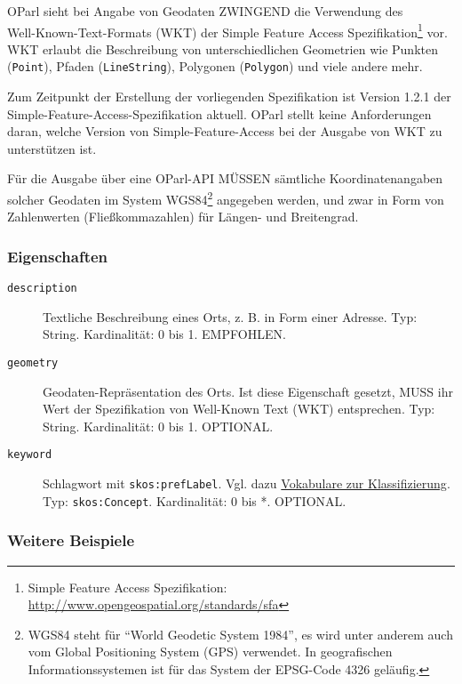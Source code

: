 \documentclass[,a4paper]{article}
\begin{document}
OParl sieht bei Angabe von Geodaten ZWINGEND die Verwendung
des\\Well-Known-Text-Formats (WKT) der Simple Feature Access
Spezifikation\footnote{Simple Feature Access Spezifikation:
  \url{http://www.opengeospatial.org/standards/sfa}} vor. WKT erlaubt
die Beschreibung von unterschiedlichen Geometrien wie Punkten
(\texttt{Point}), Pfaden (\texttt{LineString}), Polygonen
(\texttt{Polygon}) und viele andere mehr.

Zum Zeitpunkt der Erstellung der vorliegenden Spezifikation ist Version
1.2.1 der Simple-Feature-Access-Spezifikation aktuell. OParl stellt
keine Anforderungen daran, welche Version von Simple-Feature-Access bei
der Ausgabe von WKT zu unterstützen ist.

Für die Ausgabe über eine OParl-API MÜSSEN sämtliche Koordinatenangaben
solcher Geodaten im System WGS84\footnote{WGS84 steht für ``World
  Geodetic System 1984'', es wird unter anderem auch vom Global
  Positioning System (GPS) verwendet. In geografischen
  Informationssystemen ist für das System der EPSG-Code 4326 geläufig.}
angegeben werden, und zwar in Form von Zahlenwerten (Fließkommazahlen)
für Längen- und Breitengrad.

\subsubsection{Eigenschaften}\label{eigenschaften-9}

\begin{description}
\item[\texttt{description}]
Textliche Beschreibung eines Orts, z. B. in Form einer Adresse. Typ:
String. Kardinalität: 0 bis 1. EMPFOHLEN.
\item[\texttt{geometry}]
Geodaten-Repräsentation des Orts. Ist diese Eigenschaft gesetzt, MUSS
ihr Wert der Spezifikation von Well-Known Text (WKT) entsprechen. Typ:
String. Kardinalität: 0 bis 1. OPTIONAL.
\item[\texttt{keyword}]
Schlagwort mit \texttt{skos:prefLabel}. Vgl. dazu
\hyperref[vokabulareux5fklassifizierung]{Vokabulare zur
Klassifizierung}. Typ: \texttt{skos:Concept}. Kardinalität: 0 bis *.
OPTIONAL.
\end{description}

\subsubsection{Weitere Beispiele}\label{weitere-beispiele}
\end{document}
